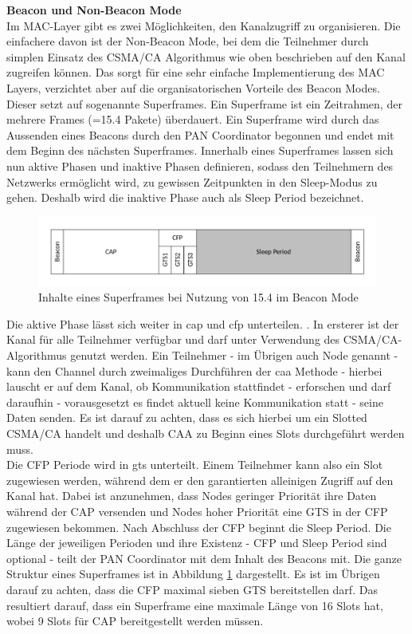 \textbf{Beacon und Non-Beacon Mode}\\
Im MAC-Layer gibt es zwei Möglichkeiten, den Kanalzugriff zu organisieren. Die einfachere davon ist der Non-Beacon Mode, bei dem die Teilnehmer durch simplen Einsatz des CSMA/CA Algorithmus wie oben beschrieben auf den Kanal zugreifen können. Das sorgt für eine sehr einfache Implementierung des MAC Layers, verzichtet aber auf die organisatorischen Vorteile des Beacon Modes.\\
Dieser setzt auf sogenannte Superframes. Ein Superframe ist ein Zeitrahmen, der mehrere Frames (=15.4 Pakete) überdauert. Ein Superframe wird durch das Aussenden eines Beacons durch den PAN Coordinator begonnen und endet mit dem Beginn des nächsten Superframes. Innerhalb eines Superframes lassen sich nun aktive Phasen und inaktive Phasen definieren, sodass den Teilnehmern des Netzwerks ermöglicht wird, zu gewissen Zeitpunkten in den Sleep-Modus zu gehen. Deshalb wird die inaktive Phase auch als Sleep Period bezeichnet.\\
\begin{figure}
	\centering
	\includegraphics[width=\textwidth]{Grafiken-Alex/superframe.pdf}
	\caption{Inhalte eines Superframes bei Nutzung von 15.4 im Beacon Mode}
	\label{superframe}
\end{figure}
Die aktive Phase lässt sich weiter in \ac{cap} und \ac{cfp} unterteilen. \cite{superframestructure}. In ersterer ist der Kanal für alle Teilnehmer verfügbar und darf unter Verwendung des CSMA/CA-Algorithmus genutzt werden. Ein Teilnehmer - im Übrigen auch Node genannt - kann den Channel durch zweimaliges Durchführen der \ac{caa} Methode - hierbei lauscht er auf dem Kanal, ob Kommunikation stattfindet - erforschen und darf daraufhin - vorausgesetzt es findet aktuell keine Kommunikation statt - seine Daten senden. \cite{sarodeslottedscmaca} Es ist darauf zu achten, dass es sich hierbei um ein Slotted CSMA/CA handelt und deshalb CAA zu Beginn eines Slots durchgeführt werden muss. \\
Die CFP Periode wird in \ac{gts} unterteilt. Einem Teilnehmer kann also ein Slot zugewiesen werden, während dem er den garantierten alleinigen Zugriff auf den Kanal hat. Dabei ist anzunehmen, dass Nodes geringer Priorität ihre Daten während der CAP versenden und Nodes hoher Priorität eine GTS in der CFP zugewiesen bekommen. Nach Abschluss der CFP beginnt die Sleep Period. Die Länge der jeweiligen Perioden und ihre Existenz - CFP und Sleep Period sind optional - teilt der PAN Coordinator mit dem Inhalt des Beacons mit. Die ganze Struktur eines Superframes ist in Abbildung \ref{superframe} dargestellt. Es ist im Übrigen darauf zu achten, dass die CFP maximal sieben GTS bereitstellen darf. Das resultiert darauf, dass ein Superframe eine maximale Länge von 16 Slots hat, wobei 9 Slots für CAP bereitgestellt werden müssen.

